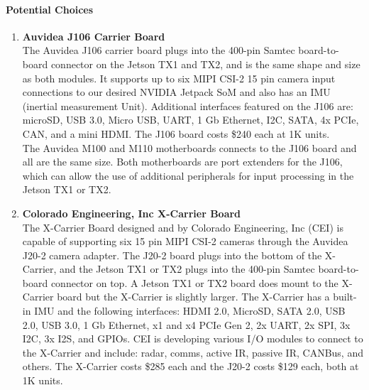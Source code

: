 \paragraph{Potential Choices}
	\begin{enumerate}
		\item\textbf{Auvidea J106 Carrier Board}\\
			The Auvidea J106 carrier board plugs into the 400-pin Samtec board-to-board connector 
			on the Jetson TX1 and TX2, and is the same shape and size as both modules. 
			It supports up to six MIPI CSI-2 15 pin camera input connections to our 
			desired NVIDIA Jetpack SoM and also has an IMU (inertial measurement Unit). Additional 
			interfaces featured on the J106 are: microSD, USB 
			3.0, Micro USB, UART, 1 Gb Ethernet, I2C, SATA, 4x PCIe, CAN, and a mini 
			HDMI\cite{AuvideaJ106}. The J106 board costs \$240 each at 1K units\cite{AuvideaQuote}.\\

			The Auvidea M100 and M110 motherboards connects to the J106 board and all are the same 
			size. Both motherboards are port extenders for the J106, which can allow the use of 
			additional peripherals for input processing in the Jetson TX1 or 
			TX2\cite{AuvideaMBoards}. \\

		\item\textbf{Colorado Engineering, Inc X-Carrier Board}\\
			The X-Carrier Board designed and by Colorado Engineering, Inc (CEI) is capable of 
			supporting six 15 pin MIPI CSI-2 cameras through the Auvidea J20-2 camera adapter. The 
			J20-2 board plugs into the bottom of the X-Carrier, and the Jetson TX1 or TX2 plugs 
			into the 400-pin Samtec board-to-board connector on top. A Jetson TX1 or TX2 board does 
			mount to the X-Carrier board but the X-Carrier is slightly larger. The X-Carrier has a built-in IMU 
			and the following interfaces: HDMI 2.0, MicroSD, SATA 2.0, USB 2.0, USB 3.0, 1 Gb 
			Ethernet, x1 and x4 PCIe Gen 2, 2x UART, 2x SPI, 3x I2C, 3x I2S, and GPIOs. CEI is  
			developing various I/O modules to connect to the X-Carrier and include: radar, comms, 
			active IR, passive IR, CANBus, and others\cite{CEIXpdf, J20TechRef, AuvideaJ20}. The X-Carrier costs \$285 each 
			and the J20-2 costs \$129 each, both at 1K units\cite{SpacelyQuote, AuvideaQuote}. \\
	

\end{enumerate}
